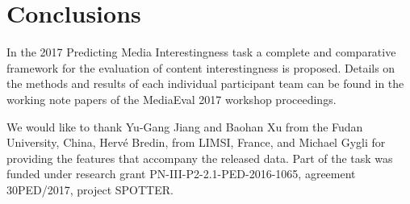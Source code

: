 \documentclass[sigconf]{acmart-me}
\begin{document}
\vspace{-0.2cm}
\section{Conclusions}
In the 2017 Predicting Media Interestingness task a complete and comparative framework for the evaluation of content interestingness is proposed. 
Details on the methods and results of each individual
participant team can be found in the working note papers of the
MediaEval 2017 workshop proceedings.

\vspace{-0.2cm}
\begin{acks}
{\small
We would like to thank Yu-Gang Jiang and Baohan Xu
from the Fudan University, China, Herv\'{e} Bredin, from LIMSI,
France, and Michael Gygli for providing the features that accompany the
released data. Part of the task was funded under research grant PN-III-P2-2.1-PED-2016-1065, agreement 30PED/2017, project SPOTTER.}
\end{acks}



\def\bibfont{\small} %

\end{document}
